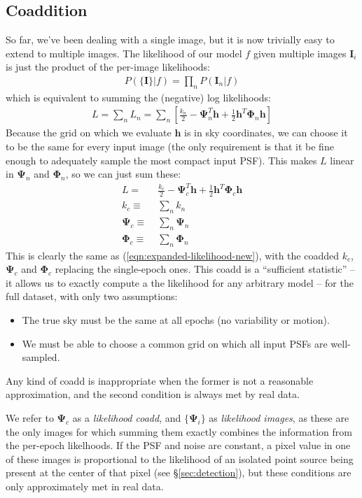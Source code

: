 \documentclass[10pt]{article}
\newcommand{\eqnref}[1]{(\ref{eqn:#1})}
\newcommand{\secref}[1]{\S\ref{sec:#1}}
\begin{document}
\subsection{Coaddition}

So far, we've been dealing with a single image, but it is now trivially easy to extend to multiple images.  The likelihood of our model $f$ given multiple images $\bm{I}_i$ is just the product of the per-image likelihoods:
\begin{align}
    P(\{\bm{I}\}|f) = \prod_n P(\bm{I}_n|f)
\end{align}
which is equivalent to summing the (negative) log likelihoods:
\begin{align}
    L = \sum_n L_n =
        \sum_n \left[ \frac{k_n}{2} - \bm{\Psi}_n^T\!\bm{h}
        + \frac{1}{2}\bm{h}^T\!\bm{\Phi}_n\bm{h} \right]
\end{align}
Because the grid on which we evaluate $\bm{h}$ is in sky coordinates, we can choose it to be the same for every input image (the only requirement is that it be fine enough to adequately sample the most compact input PSF).
This makes $L$ linear in $\bm{\Psi}_n$ and $\bm{\Phi}_n$, so we can just sum these:
\begin{align}
    L =\;& \frac{k_c}{2} - \bm{\Psi}_c^T\!\bm{h} + \frac{1}{2}\bm{h}^T\!\bm{\Phi}_c\bm{h} \\
    k_c \equiv\;& \sum_n k_n \\
    \bm{\Psi}_c \equiv\;& \sum_n \bm{\Psi}_n \\
    \bm{\Phi}_c \equiv\;& \sum_n \bm{\Phi}_n
\end{align}
This is clearly the same as \eqnref{expanded-likelihood-new}, with the coadded $k_c$, $\bm{\Psi}_c$ and $\bm{\Phi}_c$ replacing the single-epoch ones.  This coadd is a ``sufficient statistic'' -- it allows us to exactly compute a the likelihood for any arbitrary model -- for the full dataset, with only two assumptions:
\begin{itemize}
\item The true sky must be the same at all epochs (no variability or motion).
\item We must be able to choose a common grid on which all input PSFs are well-sampled.
\end{itemize}
Any kind of coadd is inappropriate when the former is not a reasonable approximation, and the second condition is always met by real data.

We refer to $\bm{\Psi}_c$ as a \emph{likelihood coadd}, and $\{\bm{\Psi}_i\}$ as \emph{likelihood images}, as these are the only images for which summing them exactly combines the information from the per-epoch likelhoods.  If the PSF and noise are constant, a pixel value in one of these images is proportional to the likelihood of an isolated point source being present at the center of that pixel (see \secref{detection}), but these conditions are only approximately met in real data.
\end{document}
